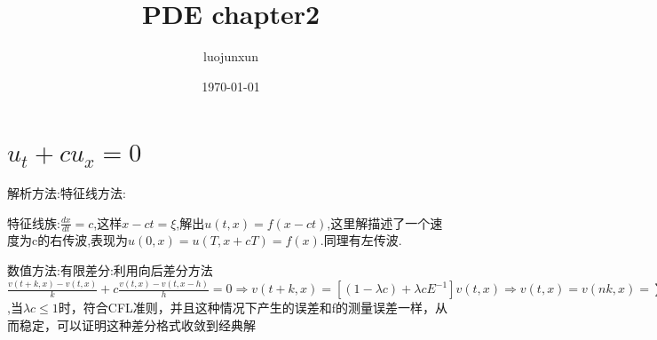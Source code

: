 \documentclass[12pt, a4paper, oneside]{ctexart}
\title{\huge\textbf{PDE chapter2}}
\author{luojunxun}
\date{\today}
\begin{document}
\maketitle

\section{$u_t+cu_x=0$}
解析方法:特征线方法:\par
特征线族:$\frac{dx}{dt}=c$,这样$x-ct=\xi$,解出$u(t,x)=f(x-ct)$,这里解描述了一个速度为c的右传波,表现为$u(0,x)=u(T,x+cT)=f(x)$.同理有左传波.

数值方法:有限差分:利用向后差分方法$\frac{v(t+k,x)-v(t,x)}{k}+c\frac{v(t,x)-v(t,x-h)}{h}=0\Rightarrow v(t+k,x) = [(1-\lambda c)+\lambda cE^{-1}]v(t,x)\Rightarrow v(t,x)=v(nk,x)=\sum_{i=0}^nC_n^i(1-\lambda c)^i(\lambda c)^{n-i}f(x-(n-i)h)  $,当$\lambda c\leq 1$时，符合CFL准则，并且这种情况下产生的误差和f的测量误差一样，从而稳定，可以证明这种差分格式收敛到经典解



















% 
% 
\end{document}
